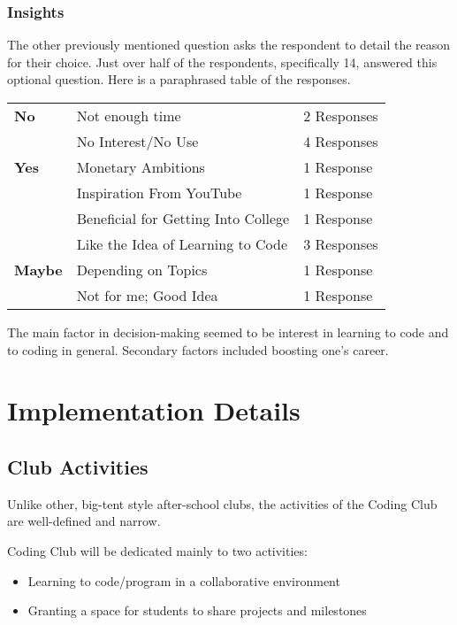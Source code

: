\documentclass{report}
\begin{document}
\subsubsection{Insights}

The other previously mentioned question asks the respondent to detail the reason for their choice. Just over half of the respondents, specifically 14, answered this optional question. Here is a paraphrased table of the responses.\vspace{0.25em}

\begin{center}
	\begin{tabular}{l|l|l}
		\textbf{No}    & Not enough time                     & 2 Responses \\
		               & No Interest/No Use                  & 4 Responses \\ \hline
		\textbf{Yes}   & Monetary Ambitions                  & 1 Response  \\
		               & Inspiration From YouTube            & 1 Response  \\
		               & Beneficial for Getting Into College & 1 Response  \\
		               & Like the Idea of Learning to Code   & 3 Responses \\ \hline
		\textbf{Maybe} & Depending on Topics                 & 1 Response  \\
		               & Not for me; Good Idea               & 1 Response  \\
	\end{tabular}
\end{center}

The main factor in decision-making seemed to be interest in learning to code and to coding in general. Secondary factors included boosting one's career.
\section*{Implementation Details}

\subsection*{Club Activities}

Unlike other, big-tent style after-school clubs, the activities of the Coding Club are well-defined and narrow.

Coding Club will be dedicated mainly to two activities:
\begin{itemize}
	\item Learning to code/program in a collaborative environment
	\item Granting a space for students to share projects and milestones
\end{itemize}
\end{document}
